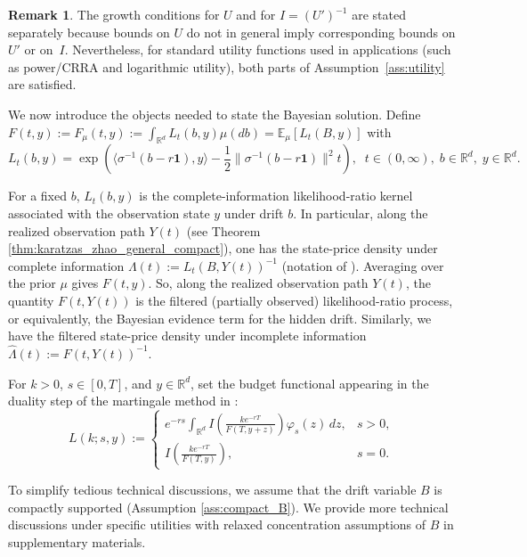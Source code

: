 \documentclass[11pt]{article}
\theoremstyle{definition}
\newtheorem{remark}{Remark}
\newcommand{\E}{\mathbb{E}}
\begin{document}
\begin{remark}
The growth conditions for $U$ and for $I=(U')^{-1}$ are stated separately because
bounds on $U$ do not in general imply corresponding bounds on $U'$ or on~$I$.
Nevertheless, for standard utility functions used in applications
(such as power/CRRA and logarithmic utility), both parts of
Assumption~\ref{ass:utility} are satisfied. 
\end{remark}



We now introduce the objects needed to state the Bayesian solution. Define 
$F(t,y) := F_{\mu}(t,y) := \int_{\mathbb{R}^d}  L_t(b,y) \mu(d b) = \E_{\mu}[L_t(B, y)]$   
with
\begin{equation}\label{eq:L_func}
L_t(b,y) = 
\exp\left( \langle \sigma^{-1}(b - r\mathbf{1}), y \rangle - \frac{1}{2} \|\sigma^{-1}(b - r\mathbf{1})\|^2 t \right), \;\; t \in (0, \infty), \; b \in \mathbb{R}^d, \; y \in \mathbb{R}^d. %
\end{equation}

{
For a fixed $b$, $L_t(b,y)$ is the complete-information likelihood-ratio kernel associated with the observation state $y$ under drift $b$. In particular, along the realized observation path $Y(t)$ (see Theorem \ref{thm:karatzas_zhao_general_compact}), one has the state-price density under complete information $\Lambda(t):=L_t(B,Y(t))^{-1}$ (notation of \cite{KZ98}). 
Averaging over the prior $\mu$ gives $F(t,y)$. So, along the realized observation path $Y(t)$, the quantity $F(t,Y(t))$ is the filtered (partially observed) likelihood-ratio process, or equivalently, the Bayesian evidence term for the hidden drift. Similarly, we have the filtered state-price density under incomplete information $\widehat\Lambda(t) :=F(t,Y(t))^{-1}$.
}

For $k>0$, $s\in[0,T]$, and $y\in\mathbb{R}^d$, set {the budget functional appearing in the duality step of the martingale method in \cite{KZ98}:}
\begin{equation}\label{eq:LKdef}
L(k;s,y):=
\begin{cases}
e^{-rs}\displaystyle\int_{\mathbb{R}^d} I\!\left( \frac{k e^{-rT}}{F(T, y+z)} \right) \varphi_s(z) \, d z, & s>0,\\[1.2em]
I\!\left( \frac{k e^{-rT}}{F(T, y)} \right), & s=0.
\end{cases}
\end{equation}


To simplify tedious technical discussions, we assume that the drift variable $B$ is compactly supported (Assumption \ref{ass:compact_B}). We provide more technical discussions under specific utilities with relaxed concentration assumptions of $B$ in supplementary materials. 
\end{document}
